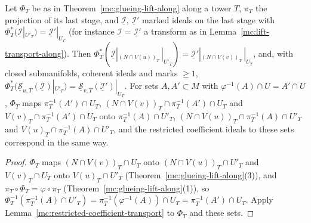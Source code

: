 \begin{lemma}
\label{mc:restricted-coefficient-lift-along}
\leanok
Let \(\Phi_T\) be as in Theorem~\ref{mc:glueing-lift-along} along a tower \(T\), \(\pi_T\) the projection of its last stage, and \(\underline{\mathcal I}\), \(\underline{\mathcal I}'\)
marked ideals on the last stage with \(\Phi_T^*(\underline{\mathcal I}|_{U'_T})=\underline{\mathcal I}'|_{U_T}\) (for instance \(\underline{\mathcal I}=\underline{\mathcal I}'\) a transform
as in Lemma~\ref{mc:lift-transport-along}). Then
\(\Phi_T^*(\underline{\mathcal I}|_{(N\cap V(u))_T}\,|_{U'_T})=\underline{\mathcal I}'|_{(N\cap V(v))_T}\,|_{U_T}\), and, with closed submanifolds, coherent ideals and marks
\(\ge1\), \(\Phi_T^*(\underline{\mathcal S}_{u,T}(\underline{\mathcal I})|_{U'_T})=\underline{\mathcal S}_{v,T}(\underline{\mathcal I}')|_{U_T}\). For sets \(A,A'\subset M\) with
\(\varphi^{-1}(A)\cap U=A'\cap U\), \(\Phi_T\) maps \(\pi_T^{-1}(A')\cap U_T\), \((N\cap V(v))_T\cap\pi_T^{-1}(A')\cap U_T\) and \(V(v)_T\cap\pi_T^{-1}(A')\cap U_T\) onto
\(\pi_T^{-1}(A)\cap U'_T\), \((N\cap V(u))_T\cap\pi_T^{-1}(A)\cap U'_T\) and \(V(u)_T\cap\pi_T^{-1}(A)\cap U'_T\), and the restricted coefficient ideals to these sets
correspond in the same way.
\end{lemma}
\begin{proof}
\leanok
\(\Phi_T\) maps \((N\cap V(v))_T\cap U_T\) onto \((N\cap V(u))_T\cap U'_T\) and \(V(v)_T\cap U_T\) onto \(V(u)_T\cap U'_T\) (Theorem~\ref{mc:glueing-lift-along}(3)), and
\(\pi_T\circ\Phi_T=\varphi\circ\pi_T\) (Theorem~\ref{mc:glueing-lift-along}(1)), so \(\Phi_T^{-1}(\pi_T^{-1}(A)\cap U'_T)=\pi_T^{-1}(\varphi^{-1}(A))\cap U_T=\pi_T^{-1}(A')\cap U_T\).
Apply Lemma~\ref{mc:restricted-coefficient-transport} to \(\Phi_T\) and these sets.
\end{proof}

